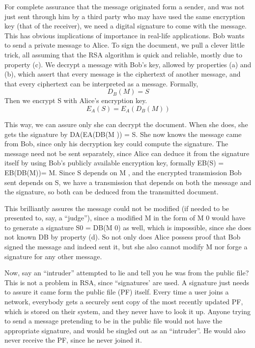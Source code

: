 \documentclass{article}
\begin{document}
For complete assurance that the message originated form a sender, and was not just sent through him
by a third party who may have used the same encryption key (that of the receiver), we need a digital signature to come with the message. This has obvious implications of importance in real-life applications. 
Bob wants to send a private message to Alice. To sign the document, we pull a clever little trick, all assuming that the RSA algorithm is quick and reliable, mostly due to property (c). We decrypt a message with Bob’s key, allowed by properties (a) and (b), which assert that every message is the ciphertext of another message, and that every ciphertext can be interpreted as a message. Formally, 
\begin{equation}
D_B(M ) = S
\end{equation}
Then we encrypt S with Alice’s encryption key.
\begin{equation}
E_A(S) = E_A(D_B(M))
\end{equation}

This way, we can assure only she can decrypt the document. When she does, she gets the signature by DA(EA(DB(M )) = S. She now knows the message came from Bob, since only his decryption key could compute the signature. The message need not be sent separately, since Alice can deduce it from the signature itself by using Bob’s publicly available encryption key, formally EB(S) = EB(DB(M))= M. Since S depends on M , and the encrypted transmission Bob sent depends on S, we have a transmission that depends on both the message and the signature, so both can be deduced from the transmitted document. 
\\\par\setlength\parindent{2em}

This brilliantly assures the message could not be modified (if needed to be presented to, say, a “judge”), since a modified M in the form of M 0 would have to generate a signature S0 = DB(M 0) as well, which is impossible, since she does not known DB by property (d). 
So not only does Alice possess proof that Bob signed the message and indeed sent it, but she also cannot modify M nor forge a signature for any other message. 
\\\par\setlength\parindent{2em}

Now, say an “intruder” attempted to lie and tell you he was from the public file? This is not a problem in RSA, since “signatures’ are used. A signature just needs to assure it came form the public file (PF) itself. Every time a user joins a network, everybody gets a securely sent copy of the most recently updated PF, which is stored on their system, and they never have to look it up. Anyone trying to send a message pretending to be in the public file would not have the appropriate signature, and would be singled out as an “intruder”. He would also never receive the PF, since he never joined it. 
\\\par\setlength\parindent{2em}
\end{document}
